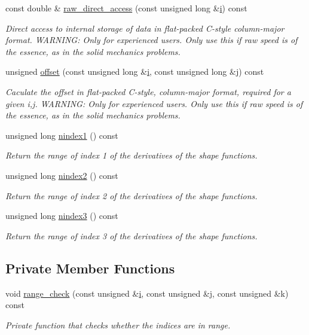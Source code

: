\begin{DoxyCompactItemize}
const double \& \hyperlink{classoomph_1_1DShape_a40a1725b36ba80253bea100c2716abbf}{raw\+\_\+direct\+\_\+access} (const unsigned long \&\hyperlink{cfortran_8h_adb50e893b86b3e55e751a42eab3cba82}{i}) const
\begin{DoxyCompactList}\small\item\em Direct access to internal storage of data in flat-\/packed C-\/style column-\/major format. W\+A\+R\+N\+I\+NG\+: Only for experienced users. Only use this if raw speed is of the essence, as in the solid mechanics problems. \end{DoxyCompactList}\item 
unsigned \hyperlink{classoomph_1_1DShape_a2ab233f026b70956e8ab520470ef20ec}{offset} (const unsigned long \&\hyperlink{cfortran_8h_adb50e893b86b3e55e751a42eab3cba82}{i}, const unsigned long \&j) const
\begin{DoxyCompactList}\small\item\em Caculate the offset in flat-\/packed C-\/style, column-\/major format, required for a given i,j. W\+A\+R\+N\+I\+NG\+: Only for experienced users. Only use this if raw speed is of the essence, as in the solid mechanics problems. \end{DoxyCompactList}\item 
unsigned long \hyperlink{classoomph_1_1DShape_a6c3a1de88d42417bbb35ad62655a5ed3}{nindex1} () const
\begin{DoxyCompactList}\small\item\em Return the range of index 1 of the derivatives of the shape functions. \end{DoxyCompactList}\item 
unsigned long \hyperlink{classoomph_1_1DShape_a1ce1aa1abc964aaea4b21d7de2aa559e}{nindex2} () const
\begin{DoxyCompactList}\small\item\em Return the range of index 2 of the derivatives of the shape functions. \end{DoxyCompactList}\item 
unsigned long \hyperlink{classoomph_1_1DShape_a1a5a3dc7227cdf09f16484e7125df913}{nindex3} () const
\begin{DoxyCompactList}\small\item\em Return the range of index 3 of the derivatives of the shape functions. \end{DoxyCompactList}\end{DoxyCompactItemize}
\subsection*{Private Member Functions}
\begin{DoxyCompactItemize}
\item 
void \hyperlink{classoomph_1_1DShape_aa6dca57c2462c28257b67500e9840b98}{range\+\_\+check} (const unsigned \&\hyperlink{cfortran_8h_adb50e893b86b3e55e751a42eab3cba82}{i}, const unsigned \&j, const unsigned \&k) const
\begin{DoxyCompactList}\small\item\em Private function that checks whether the indices are in range. \end{DoxyCompactList}\end{DoxyCompactItemize}
